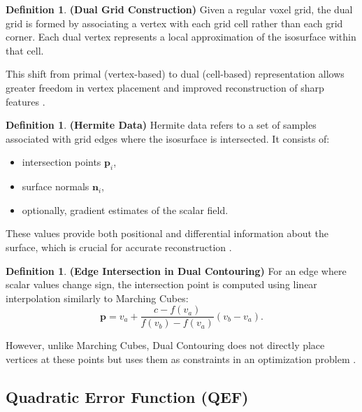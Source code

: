 \documentclass[12pt, a4paper, oneside]{book}
\theoremstyle{plain}
\theoremstyle{definition}
\newtheorem{definition}[theorem]{Definition}
\theoremstyle{remark}
\theoremstyle{definition}
\begin{document}
\vspace{0.5em}

\begin{definition}
    \textbf{(Dual Grid Construction)}
Given a regular voxel grid, the dual grid is formed by associating a vertex with each grid cell rather than each grid corner. Each dual vertex represents a local approximation of the isosurface within that cell.
\end{definition}


This shift from primal (vertex-based) to dual (cell-based) representation allows greater freedom in vertex placement and improved reconstruction of sharp features \cite{ju2002dual}.

\vspace{0.5em}

\begin{definition}
    \textbf{(Hermite Data)}
Hermite data refers to a set of samples associated with grid edges where the isosurface is intersected. It consists of:
\begin{itemize}
    \item intersection points $\mathbf{p}_i$,
    \item surface normals $\mathbf{n}_i$,
    \item optionally, gradient estimates of the scalar field.
\end{itemize}
\end{definition}


These values provide both positional and differential information about the surface, which is crucial for accurate reconstruction \cite{ju2002dual,kobbelt2001feature}.

\vspace{0.5em}
\begin{definition}
    \textbf{(Edge Intersection in Dual Contouring)}
For an edge where scalar values change sign, the intersection point is computed using linear interpolation similarly to Marching Cubes:
\[
\mathbf{p} = v_a + \frac{c - f(v_a)}{f(v_b) - f(v_a)} (v_b - v_a).
\]
\end{definition}


However, unlike Marching Cubes, Dual Contouring does not directly place vertices at these points but uses them as constraints in an optimization problem \cite{ju2002dual}.

\vspace{0.5em}

\subsection{Quadratic Error Function (QEF)}
\end{document}
